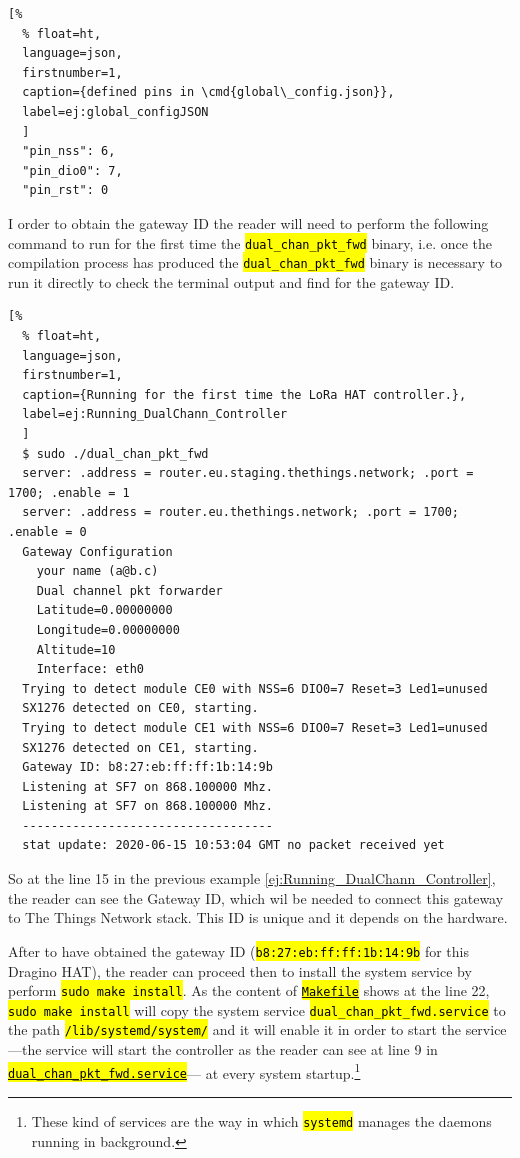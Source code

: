 \documentclass[11pt,a4paper,dvipsnames,twoside]{article}
\newcommand{\cmd}[1] {\hl{\texttt{#1}}}
\begin{document}
\begin{lstlisting}[%
  % float=ht,
  language=json,
  firstnumber=1,
  caption={defined pins in \cmd{global\_config.json}},
  label=ej:global_configJSON
  ]
  "pin_nss": 6,
  "pin_dio0": 7,
  "pin_rst": 0
\end{lstlisting}

I order to obtain the gateway ID the reader will need to perform the following command to run for the first time the \cmd{dual\_chan\_pkt\_fwd} binary, i.e. once the compilation process has produced the \cmd{dual\_chan\_pkt\_fwd} binary is necessary to run it directly to check the terminal output and find for the gateway ID.

\begin{lstlisting}[%
  % float=ht,
  language=json,
  firstnumber=1,
  caption={Running for the first time the LoRa HAT controller.},
  label=ej:Running_DualChann_Controller
  ]
  $ sudo ./dual_chan_pkt_fwd
  server: .address = router.eu.staging.thethings.network; .port = 1700; .enable = 1
  server: .address = router.eu.thethings.network; .port = 1700; .enable = 0
  Gateway Configuration
    your name (a@b.c)
    Dual channel pkt forwarder
    Latitude=0.00000000
    Longitude=0.00000000
    Altitude=10
    Interface: eth0
  Trying to detect module CE0 with NSS=6 DIO0=7 Reset=3 Led1=unused
  SX1276 detected on CE0, starting.
  Trying to detect module CE1 with NSS=6 DIO0=7 Reset=3 Led1=unused
  SX1276 detected on CE1, starting.
  Gateway ID: b8:27:eb:ff:ff:1b:14:9b
  Listening at SF7 on 868.100000 Mhz.
  Listening at SF7 on 868.100000 Mhz.
  -----------------------------------
  stat update: 2020-06-15 10:53:04 GMT no packet received yet 
\end{lstlisting}

So at the line 15 in the previous example \ref{ej:Running_DualChann_Controller}, the reader can see the Gateway ID, which wil be needed to connect this gateway to The Things Network stack. This ID is unique and it depends on the hardware.

After to have obtained the gateway ID (\cmd{b8:27:eb:ff:ff:1b:14:9b} for this Dragino HAT), the reader can proceed then to install the system service by perform \cmd{sudo make install}. As the content of \href{https://github.com/dragino/dual_chan_pkt_fwd/blob/master/Makefile#L22}{\cmd{Makefile}} shows at the line 22, \cmd{sudo make install} will copy the system service \cmd{dual\_chan\_pkt\_fwd.service} to the path \cmd{/lib/systemd/system/} and it will enable it in order to start the service ---the service will start the controller as the reader can see at line 9 in \href{https://github.com/dragino/dual_chan_pkt_fwd/blob/master/dual_chan_pkt_fwd.service#L9}{\cmd{dual\_chan\_pkt\_fwd.service}}--- at every system startup.\footnote{These kind of services are the way in which \cmd{systemd} manages the daemons running in background.} 
\end{document}
